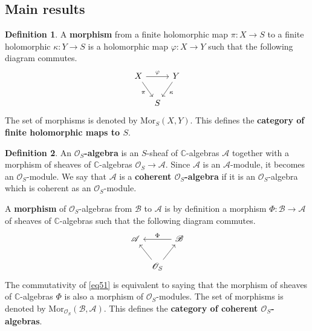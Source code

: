 \documentclass[12pt,b5paper,notitlepage]{report}
\theoremstyle{definition}
\newtheorem{df}{Definition}[section]
\theoremstyle{plain}
\newcommand{\scr}{\mathscr}
\newcommand{\Cbb}{\mathbb C}
\newcommand{\Mor}{\mathrm{Mor}}
\numberwithin{equation}{section}
\begin{document}
\subsection{Main results}



\begin{df}\label{lb228}
A \textbf{morphism} from a finite holomorphic map $\pi:X\rightarrow S$ to a finite holomorphic $\kappa:Y\rightarrow S$ is a holomorphic map $\varphi:X\rightarrow Y$ such that the following diagram commutes.
\begin{equation}\label{eq50}
\begin{tikzcd}[column sep=tiny]
X \arrow[rd,"\pi"'] \arrow[rr,"\varphi"] &   & Y \arrow[ld,"\kappa"] \\
                        & S &             
\end{tikzcd}
\end{equation}
The set of morphisms is denoted by $\Mor_S(X,Y)$. This defines the \textbf{category of finite holomorphic maps to $S$}.
\end{df}



\begin{df}
An \textbf{$\scr O_S$-algebra} is an $S$-sheaf of $\Cbb$-algebras $\scr A$ together with a morphism of sheaves of $\Cbb$-algebras $\scr O_S\rightarrow \scr A$. Since $\scr A$ is an $\scr A$-module, it becomes an $\scr O_S$-module. We say that $\scr A$ is a \textbf{coherent $\scr O_S$-algebra} if it is an $\scr O_S$-algebra which is coherent as an $\scr O_S$-module. 

A \textbf{morphism} of $\scr O_S$-algebras from $\scr B$ to $\scr A$ is by definition a morphism $\Phi:\scr B\rightarrow\scr A$ of sheaves of $\Cbb$-algebras such that the following diagram commutes.
\begin{equation}\label{eq51}
\begin{tikzcd}[column sep=tiny]
\scr A & & \scr B \arrow[ll,"\Phi"']\\
& \scr O_S \arrow[ul] \arrow[ru] &
\end{tikzcd}
\end{equation}
The commutativity of \eqref{eq51} is equivalent to saying that the morphism of sheaves of $\Cbb$-algebras $\Phi$ is also a morphism of $\scr O_S$-modules. The set of morphisms is denoted by $\Mor_{\scr O_S}(\scr B,\scr A)$. This defines the \textbf{category of coherent $\scr O_S$-algebras}. \hfill\qedsymbol
\end{df}
\end{document}
